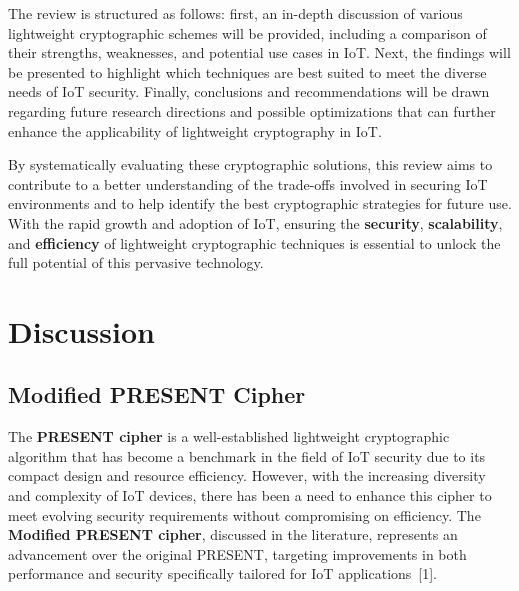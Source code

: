 \documentclass{article}
\begin{document}
The review is structured as follows: first, an in-depth discussion of various lightweight cryptographic schemes will be provided, including a comparison of their strengths, weaknesses, and potential use cases in IoT. Next, the findings will be presented to highlight which techniques are best suited to meet the diverse needs of IoT security. Finally, conclusions and recommendations will be drawn regarding future research directions and possible optimizations that can further enhance the applicability of lightweight cryptography in IoT.

By systematically evaluating these cryptographic solutions, this review aims to contribute to a better understanding of the trade-offs involved in securing IoT environments and to help identify the best cryptographic strategies for future use. With the rapid growth and adoption of IoT, ensuring the \textbf{security}, \textbf{scalability}, and \textbf{efficiency} of lightweight cryptographic techniques is essential to unlock the full potential of this pervasive technology.

\section{Discussion}

\subsection{Modified PRESENT Cipher}

The \textbf{PRESENT cipher} is a well-established lightweight cryptographic algorithm that has become a benchmark in the field of IoT security due to its compact design and resource efficiency. However, with the increasing diversity and complexity of IoT devices, there has been a need to enhance this cipher to meet evolving security requirements without compromising on efficiency. The \textbf{Modified PRESENT cipher}, discussed in the literature, represents an advancement over the original PRESENT, targeting improvements in both performance and security specifically tailored for IoT applications~[1].

\end{document}
